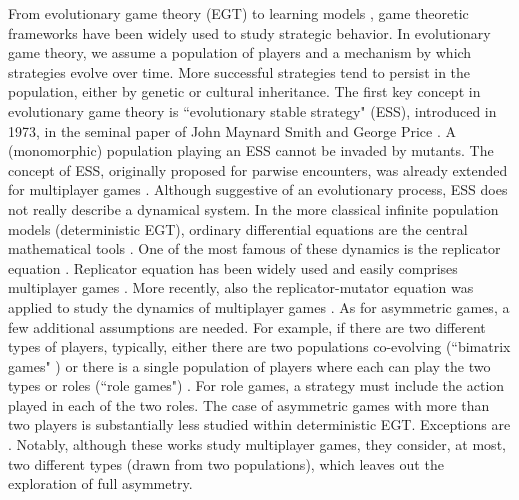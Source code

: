 \documentclass[11pt]{article}
\theoremstyle{plainCl1}
\theoremstyle{plainCl2}
\begin{document}
From evolutionary game theory (EGT) \cite{Maynard-Smith:Nature:1973, Maynard-Smith:book:1982, Hofbauer:book:1998, Nowak:book:2006} to learning models \cite{Sandholm:BioSys:1996, Fudenberg:book:1998b, Macy:PNAS:2002, Pangallo:GEB:2022}, game theoretic frameworks have been widely used to study strategic behavior. 
In evolutionary game theory, we assume a population of players and a mechanism by which strategies evolve over time. More successful strategies tend to persist in the population, either by genetic or cultural inheritance. The first key concept in evolutionary game theory is ``evolutionary stable strategy" (ESS),  introduced in 1973, in the seminal paper of John Maynard Smith and George Price \cite{Maynard-Smith:Nature:1973}. A (monomorphic) population playing an ESS cannot be invaded by mutants. The concept of ESS, originally proposed for parwise encounters, was already extended for multiplayer games \cite{Palm:JMB:1984, Broom:BMB:1997, Bukowski:IJGT:2004}. Although suggestive of an evolutionary process, ESS does not really describe a dynamical system. In the more classical infinite population models (deterministic EGT), ordinary differential equations are the central mathematical tools \cite{Hofbauer:book:1998}. One of the most famous of these dynamics is the replicator equation \cite{Taylor:MB:1978, Hofbauer:book:1998}. Replicator equation has been widely used and easily comprises multiplayer games \cite{Hauert:JTB:2006a, gokhale:PNAS:2010, Pena:Evolution:2011, Cressman:PNAS:2014, Pena:JTB:2014}. More recently, also the replicator-mutator equation was applied to study the dynamics of multiplayer games \cite{Duong:DGAA:2020}. As for asymmetric games, a few additional assumptions are needed. For example, if there are two different types of players, typically, either there are two populations co-evolving (``bimatrix games" \cite{Hofbauer:book:1998, Gokhale:PRSB:2012, Tuyls:SciRep:2018}) or there is a single population of players where each can play the two types or roles (``role games") \cite{Hofbauer:book:1998}. For role games, a strategy must include the action played in each of the two roles. The case of asymmetric games with more than two players is substantially less studied within deterministic EGT. Exceptions are  \cite{Gokhale:PRSB:2012, Zhang:arxiv:2022}. Notably, although these works study multiplayer games, they consider, at most, two different types (drawn from two populations), which leaves out the exploration of full asymmetry.
\\ \\
\end{document}
